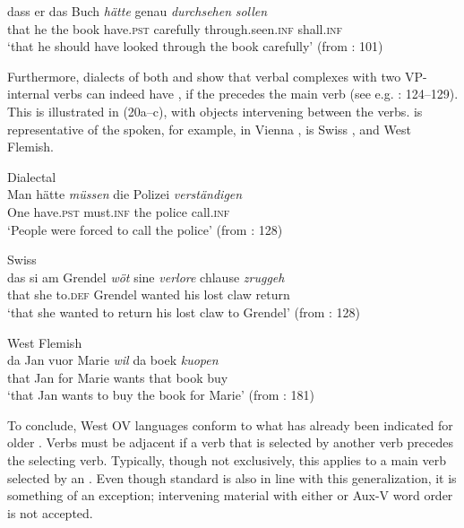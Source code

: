 \documentclass[output=paper, colorlinks, citecolor=brown]{langscibook}
\begin{document}
\ex\label{ex:sangfelt:19b}
\gll dass er das Buch \textit{hätte} {genau} \textit{durchsehen} \textit{sollen}\\
 that he the book have.\textsc{pst} carefully through.seen.\textsc{inf} shall.\textsc{inf} \\
\glt ‘that he should have looked through the book carefully’ (from \citealt{Sheehan2017Final}: 101)
\z 
\z

Furthermore, dialects of both  and  show that verbal complexes with two VP-internal verbs can indeed have , if the  precedes the main verb (see e.g. \citealt{Sapp2011}: 124–129). This is illustrated in (20a–c), with objects intervening between the verbs.  is representative of the  spoken, for example, in Vienna \citep[128]{Haider2013},  is Swiss , and  West Flemish.


\ea 
\label{ex:sangfelt:20}
\ea Dialectal \label{ex:sangfelt:20a}\\
\gll Man hätte \textit{müssen} {die} {Polizei} \textit{verständigen} \\
 One have.\textsc{pst} must.\textsc{inf} the police call.\textsc{inf} \\
\glt ‘People were forced to call the police’ (from \citealt{Haider2013}: 128)

\ex Swiss \label{ex:sangfelt:20b}\\
\gll das si am Grendel \textit{wöt} {sine} {\textit{verlore}} {chlause} \textit{zruggeh}\\
 that she to.\textsc{def} Grendel wanted his lost claw return \\
\glt ‘that she wanted to return his lost claw to Grendel’ (from \citealt{Haider2013}: 128)

\ex West Flemish\label{ex:sangfelt:20c}\\
\gll da Jan vuor Marie \textit{wil} {da} {boek} \textit{kuopen} \\
 that Jan for Marie wants that book buy \\
\glt ‘that Jan wants to buy the book for Marie’ (from \citealt{Haegeman1992}: 181)\\
\z
\z

To conclude, West  OV languages conform to what has already been indicated for older . Verbs must be adjacent if a verb that is selected by another verb precedes the selecting verb. Typically, though not exclusively, this applies to a main verb selected by an . Even though standard  is also in line with this generalization, it is something of an exception; intervening material with either  or Aux-V word order is not accepted.
\end{document}
